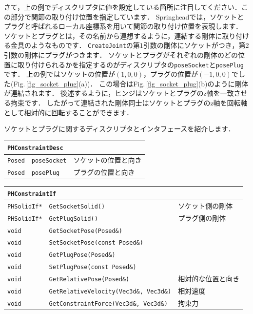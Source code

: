 \KLUDGE さて，上の例でディスクリプタに値を設定している箇所に注目してください．この部分で関節の取り付け位置を指定しています．
Springhead\KLUDGE では，ソケットとプラグと呼ばれるローカル座標系を用いて関節の取り付け位置を表現します．
\KLUDGE ソケットとプラグとは，その名前から連想するように，連結する剛体に取り付ける金具のようなものです．
\texttt{CreateJoint}\KLUDGE の第$1$\KLUDGE 引数の剛体にソケットがつき，第$2$\KLUDGE 引数の剛体にプラグがつきます．
\KLUDGE ソケットとプラグがそれぞれの剛体のどの位置に取り付けられるかを指定するのがディスクリプタの\texttt{poseSocket}\KLUDGE と\texttt{posePlug}\KLUDGE です．
\KLUDGE 上の例ではソケットの位置が$(1,0,0)$\KLUDGE ，プラグの位置が$(-1,0,0)$\KLUDGE でした(Fig.\,\ref{fig_socket_plug}(a))\KLUDGE ．
\KLUDGE この場合はFig.\,\ref{fig_socket_plug}(b)\KLUDGE のように剛体が連結されます．
\KLUDGE 後述するように，ヒンジはソケットとプラグのz\KLUDGE 軸を一致させる拘束です．
\KLUDGE したがって連結された剛体同士はソケットとプラグのz\KLUDGE 軸を回転軸として相対的に回転することができます．

\KLUDGE ソケットとプラグに関するディスクリプタとインタフェースを紹介します．

\begin{center}
\begin{tabular}{p{.15\hsize}p{.35\hsize}p{.40\hsize}}
\multicolumn{3}{l}{\texttt{PHConstraintDesc}}					\\ \midrule
\texttt{Posed}	&	\texttt{poseSocket}	& \KLUDGE ソケットの位置と向き	\\
\texttt{Posed}	&	\texttt{posePlug}	& \KLUDGE プラグの位置と向き	\\
\end{tabular}
\end{center}

\begin{center}
\begin{tabular}{p{.15\hsize}p{.50\hsize}p{.25\hsize}}
\multicolumn{3}{l}{\texttt{PHConstraintIf}}								\\ \midrule
\texttt{PHSolidIf*}	& \texttt{GetSocketSolid()}							& \KLUDGE ソケット側の剛体 \\
\texttt{PHSolidIf*} & \texttt{GetPlugSolid()}							& \KLUDGE プラグ側の剛体 \\
\texttt{void} 		& \texttt{GetSocketPose(Posed\&)}					& \\
\texttt{void} 		& \texttt{SetSocketPose(const Posed\&)}				& \\
\texttt{void} 		& \texttt{GetPlugPose(Posed\&)}						& \\
\texttt{void} 		& \texttt{SetPlugPose(const Posed\&)}				& \\
\texttt{void} 		& \texttt{GetRelativePose(Posed\&)}					& \KLUDGE 相対的な位置と向き \\
\texttt{void} 		& \texttt{GetRelativeVelocity(Vec3d\&, Vec3d\&)}	& \KLUDGE 相対速度 \\
\texttt{void} 		& \texttt{GetConstraintForce(Vec3d\&, Vec3d\&)}		& \KLUDGE 拘束力 \\
\end{tabular}
\end{center}

